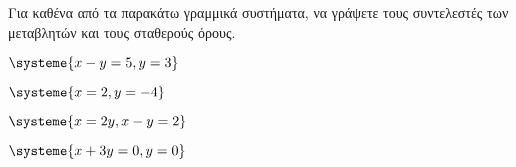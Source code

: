 Για καθένα από τα παρακάτω γραμμικά συστήματα, να γράψετε τους συντελεστές των μεταβλητών και τους σταθερούς όρους.
\begin{multicols}{2}
\begin{rlist}[leftmargin=5mm]
\item $ \systeme{x-y=5,y=3} $
\item $ \systeme{x=2,y=-4} $
\item $ \systeme{x=2y,x-y=2} $
\item $ \systeme{x+3y=0,y=0} $
\end{rlist}
\end{multicols}
